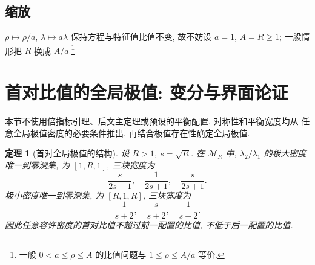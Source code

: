 \documentclass[UTF8]{ctexart}
\newtheorem{theorem}{定理}[section]
\begin{document}
\subsection{缩放}

$\rho \mapsto \rho/a$, $\lambda \mapsto a\lambda$ 保持方程与特征值比值不变,
故不妨设 $a = 1$, $A = R \geq 1$; 一般情形把 $R$ 换成 $A/a$.\footnote{一般 $0 < a \leq \rho \leq A$ 的比值问题与 $1 \leq \rho \leq A/a$ 等价.}

\section{首对比值的全局极值: 变分与界面论证}\label{sec:first-pair}

本节不使用倍指标引理、后文主定理或预设的平衡配置. 对称性和平衡宽度均从
任意全局极值密度的必要条件推出, 再结合极值存在性确定全局极值.

\begin{theorem}[首对全局极值的结构]\label{thm:first-pair}
设 $R>1$, $s=\sqrt R$. 在 $\mathcal M_R$ 中, $\lambda_2/\lambda_1$ 的极大密度
唯一到零测集, 为 $[1,R,1]$, 三块宽度为
\[
 \frac{s}{2s+1},\quad\frac1{2s+1},\quad\frac{s}{2s+1}.
\]
极小密度唯一到零测集, 为 $[R,1,R]$, 三块宽度为
\[
 \frac1{s+2},\quad\frac{s}{s+2},\quad\frac1{s+2}.
\]
因此任意容许密度的首对比值不超过前一配置的比值, 不低于后一配置的比值.
\end{theorem}
\end{document}
